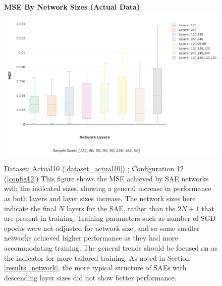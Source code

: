 \documentclass[a4paper,11pt,oneside]{article}
\theoremstyle{plain}
\theoremstyle{definition}
\begin{document}
	\begin{figure}[H]
		\centering 
		\textbf{MSE By Network Sizes (Actual Data)}
		\includegraphics[scale=0.25]{images/results/network/actual_sae_mse_box.png} 
		\caption[MSE By Network Sizes (Actual Data)]{Dataset: Actual10 (\ref{dataset_actual10}) ; Configuration 12 (\ref{config12})
			\newline This figure shows the MSE achieved by SAE networks with the indicated sizes, showing a general increase in performance as both layers and layer sizes increase. The network sizes here indicate the final $N$ layers for the SAE, rather than the $2N + 1$ that are present in training. Training parameters such as number of SGD epochs were not adjusted for network size, and so some smaller networks achieved higher performance as they had more accommodating training. The general trends should be focused on as the indicator for more tailored training. As noted in Section \ref{results_network}, the more typical structure of SAEs with descending layer sizes did not show better performance.}
		\label{figure-actual_sae_mse_box}
	\end{figure}
	
\end{document}
